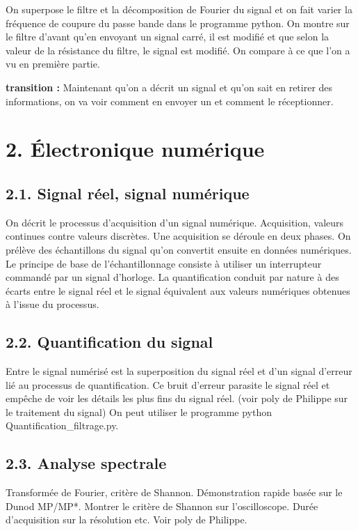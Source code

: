 \documentclass[french, a4paper, 10pt, twocolumn, landscape]{article}
\begin{document}
On superpose le filtre et la décomposition de Fourier du signal et on fait varier la fréquence de coupure du passe bande dans le programme python. On montre sur le filtre d'avant qu'en envoyant un signal carré, il est modifié et que selon la valeur de la résistance du filtre, le signal est modifié.  On compare à ce que l'on a vu en première partie.

\textbf{transition : } Maintenant qu’on a décrit un signal et qu’on sait en retirer des informations, on va voir comment en envoyer un et comment le réceptionner.


\section*{2. Électronique numérique}

\subsection*{2.1. Signal réel, signal numérique}
On décrit le processus d'acquisition d'un signal numérique. Acquisition, valeurs continues contre valeurs discrètes. Une acquisition se déroule en deux phases. On prélève des échantillons du signal qu’on convertit ensuite en données numériques. Le principe de base de l’échantillonnage consiste à utiliser un interrupteur commandé par un signal d’horloge. La quantification conduit par nature à des écarts entre le signal réel et le signal équivalent aux valeurs numériques obtenues à l’issue du processus.


\subsection*{2.2. Quantification du signal}
Entre le signal numérisé est la superposition du signal réel et d'un signal d'erreur lié au processus de quantification. Ce bruit d'erreur parasite le signal réel et empêche de voir les détails les plus fins du signal réel. (voir poly de Philippe sur le traitement du signal)
On peut utiliser le programme python Quantification_filtrage.py. 

\subsection*{2.3. Analyse spectrale}

Transformée de Fourier, critère de Shannon. Démonstration rapide basée sur le Dunod MP/MP*. Montrer le critère de Shannon sur l'oscilloscope. Durée d'acquisition sur la résolution etc. Voir poly de Philippe.
\end{document}
